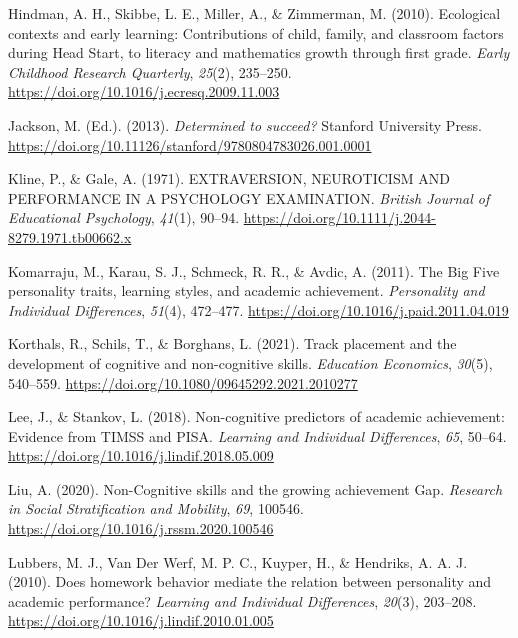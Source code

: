 \documentclass{article}
\newlength{\cslhangindent}
\newlength{\cslentryspacingunit} %
\newenvironment{CSLReferences}[2] %
 {%
  \setlength{\parindent}{0pt}
  \ifodd #1
  \let\oldpar\par
  \def\par{\hangindent=\cslhangindent\oldpar}
  \fi
  \setlength{\parskip}{#2\cslentryspacingunit}
 }%
 {}
\begin{document}
\begin{CSLReferences}{1}{0}
\leavevmode{}%
Hindman, A. H., Skibbe, L. E., Miller, A., \& Zimmerman, M. (2010).
Ecological contexts and early learning: Contributions of child, family,
and classroom factors during Head Start, to literacy and mathematics
growth through first grade. \emph{Early Childhood Research Quarterly},
\emph{25}(2), 235--250.
\url{https://doi.org/10.1016/j.ecresq.2009.11.003}

\leavevmode{}%
Jackson, M. (Ed.). (2013). \emph{Determined to succeed?} Stanford
University Press.
\url{https://doi.org/10.11126/stanford/9780804783026.001.0001}

\leavevmode{}%
Kline, P., \& Gale, A. (1971). EXTRAVERSION, NEUROTICISM AND PERFORMANCE
IN A PSYCHOLOGY EXAMINATION. \emph{British Journal of Educational
Psychology}, \emph{41}(1), 90--94.
\url{https://doi.org/10.1111/j.2044-8279.1971.tb00662.x}

\leavevmode{}%
Komarraju, M., Karau, S. J., Schmeck, R. R., \& Avdic, A. (2011). The
Big Five personality traits, learning styles, and academic achievement.
\emph{Personality and Individual Differences}, \emph{51}(4), 472--477.
\url{https://doi.org/10.1016/j.paid.2011.04.019}

\leavevmode{}%
Korthals, R., Schils, T., \& Borghans, L. (2021). Track placement and
the development of cognitive and non-cognitive skills. \emph{Education
Economics}, \emph{30}(5), 540--559.
\url{https://doi.org/10.1080/09645292.2021.2010277}

\leavevmode{}%
Lee, J., \& Stankov, L. (2018). Non-cognitive predictors of academic
achievement: Evidence from TIMSS and PISA. \emph{Learning and Individual
Differences}, \emph{65}, 50--64.
\url{https://doi.org/10.1016/j.lindif.2018.05.009}

\leavevmode{}%
Liu, A. (2020). Non-Cognitive skills and the growing achievement Gap.
\emph{Research in Social Stratification and Mobility}, \emph{69},
100546. \url{https://doi.org/10.1016/j.rssm.2020.100546}

\leavevmode{}%
Lubbers, M. J., Van Der Werf, M. P. C., Kuyper, H., \& Hendriks, A. A.
J. (2010). Does homework behavior mediate the relation between
personality and academic performance? \emph{Learning and Individual
Differences}, \emph{20}(3), 203--208.
\url{https://doi.org/10.1016/j.lindif.2010.01.005}


\end{CSLReferences}
\end{document}

